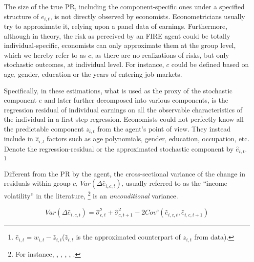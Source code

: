 The size of the true PR, including the component-specific ones under a specified structure of $e_{i,t}$, is not directly observed by economists. Econometricians 
usually try to approximate it, relying upon a panel data of earnings. Furthermore, although in theory, the risk as perceived by an FIRE agent could be totally individual-specific, economists can only approximate them at the group level, which we hereby refer to as $c$, as there are no realizations of risks, but only stochastic outcomes, at individual level. For instance, $c$ could be defined based on age, gender, education or the years of entering job markets. 


Specifically, in these estimations, what is used as the proxy of the stochastic component $e$ and later further decomposed into various components, is the regression residual of individual earnings on all the observable characteristics of the individual in a first-step regression. Economists could not perfectly know all the predictable component $z_{i,t}$ from the agent's point of view. They instead include in $\hat z_{i,t}$ factors such as age polynomials, gender, education, occupation, etc. Denote the regression-residual or the approximated stochastic component by $\hat e_{i,t}$. \footnote{$\hat e_{i,t}= w_{i,t}-\hat z_{i,t}$($\hat z_{i,t}$ is the
approximated counterpart of $z_{i,t}$ from data). } 


Different from the PR by the agent, the cross-sectional variance of the change in residuals within group $c$, $Var(\Delta \hat e_{i,c,t})$, usually referred to as the ``income volatility'' in the literature, \footnote{For instance, \cite{gottschalk1994growth}, \cite{moffitt2002trends}, \cite{sabelhaus2010great}, \cite{dynan2012evolution}, \cite{bloom2018great}.} is an  \emph{unconditional} variance. 

\begin{equation}
Var(\Delta \hat e_{i,c,t}) = \hat\sigma^2_{c,t}+ \hat\sigma^2_{c,t+1} - 2Cov^c(\hat e_{i,c,t},\hat e_{i,c,t+1})
\end{equation}


